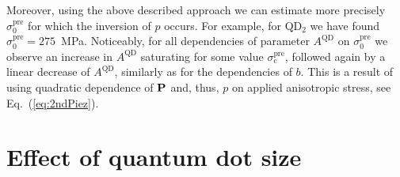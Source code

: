 %
%
Moreover, using the above described approach we can estimate more precisely $\sigma^\mathrm{pre}_\mathrm{0}$ for which the inversion of $p$ occurs. For example, for QD$_2$ we have found $\sigma^\mathrm{pre}_\mathrm{0}=275$~MPa. 
Noticeably, for all dependencies of parameter $A^{\mathrm{QD}}$ on $\sigma^\mathrm{pre}_\mathrm{0}$ we observe an increase in $A^{\mathrm{QD}}$ saturating for some value $\sigma^\mathrm{pre}_\mathrm{c}$, followed again by a linear decrease of $A^{\mathrm{QD}}$, similarly as for the dependencies of $b$. This is a result of using quadratic dependence of ${\bf P}$ and, thus, $p$ on applied anisotropic stress, see Eq.~(\ref{eq:2ndPiez}).
%












%








\section{Effect of quantum dot size}

